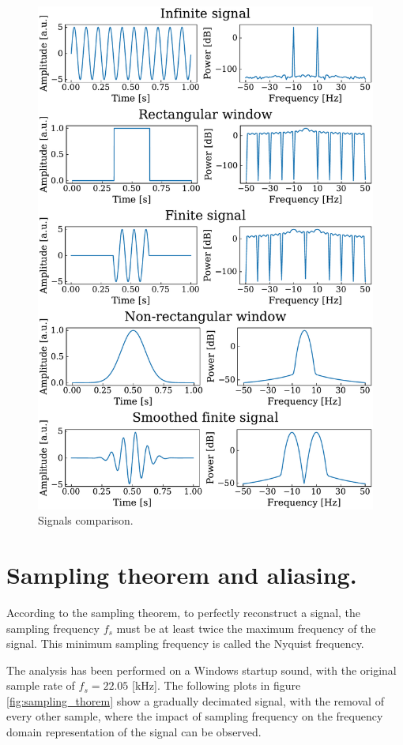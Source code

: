 \documentclass[13pt,a4paper]{article}
\begin{document}
\begin{figure}[ht!]
    \centering
    \includegraphics[width=\linewidth]{spectra_comparison.pdf}
    \caption{Signals comparison.}
    \label{fig:comparison}
\end{figure}
\clearpage


\section{Sampling theorem and aliasing.}

According to the sampling theorem, to perfectly reconstruct a signal, the sampling frequency $f_s$ must be at least twice the maximum frequency of the signal. This minimum sampling frequency is called the Nyquist frequency.

The analysis has been performed on a Windows startup sound, with the original sample rate of $f_s=22.05$ [kHz]. The following plots in figure \ref{fig:sampling_thorem} show a gradually decimated signal, with the removal of every other sample, where the impact of sampling frequency on the frequency domain representation of the signal can be observed.
\end{document}

